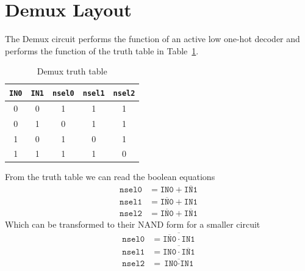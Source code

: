 

\newcommand{\reffig}[1]{Fig.~\ref{#1}}



\newpage
\section{Demux Layout}
The Demux circuit performs the function of an active low one-hot decoder and performs the function of the
truth table in Table~\ref{tab:demux}.
\begin{table}
    \center
    \begin{tabular}{c  c | c c c}
        \texttt{IN0} & \texttt{IN1} & \texttt{nsel0} & \texttt{nsel1} & \texttt{nsel2} \\ \hline
        0 & 0 & 1 & 1 & 1 \\
        0 & 1 & 0 & 1 & 1 \\
        1 & 0 & 1 & 0 & 1 \\
        1 & 1 & 1 & 1 & 0 \\
    \end{tabular}
    \caption{Demux truth table}
    \label{tab:demux}
\end{table}
From the truth table we can read the boolean equations
\begin{align*}
    \texttt{nsel0} & = \texttt{IN0} +  \overline{\texttt{IN1}} \\
    \texttt{nsel1} & = \overline{\texttt{IN0}} +  \texttt{IN1} \\
    \texttt{nsel2} & = \overline{\texttt{IN0}} +  \overline{\texttt{IN1}} 
\end{align*}
Which can be transformed to their NAND form for a smaller circuit
\begin{align*}
    \texttt{nsel0} & = \overline{\overline{\texttt{IN0}} \cdot  \texttt{IN1}} \\
    \texttt{nsel1} & =\overline{\texttt{IN0} \cdot  \overline{\texttt{IN1}}} \\
    \texttt{nsel2} & = \overline{\texttt{IN0} \cdot \texttt{IN1}}
\end{align*}
